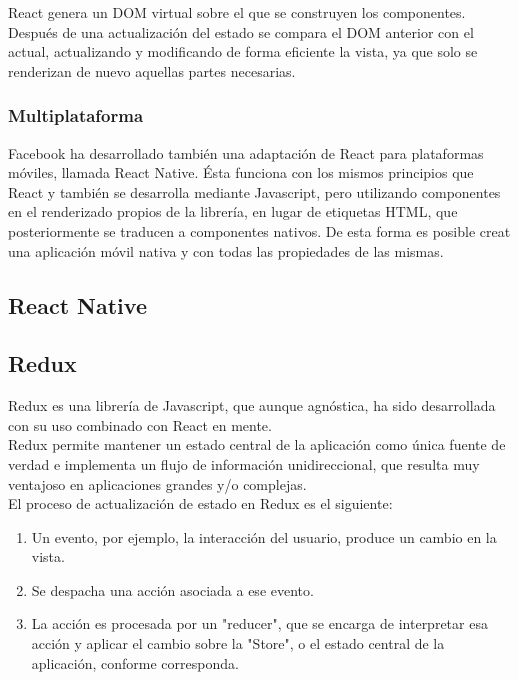 React genera un DOM virtual sobre el que se construyen los componentes. Después de una actualización del estado se compara el DOM anterior con el actual, actualizando y modificando de forma eficiente la vista, ya que solo se renderizan de nuevo aquellas partes necesarias.  \\

\subsubsection {Multiplataforma}

Facebook ha desarrollado también una adaptación de React para plataformas móviles, llamada React Native. Ésta funciona con los mismos principios que React y también se desarrolla mediante Javascript, pero utilizando componentes en el renderizado propios de la librería, en lugar de etiquetas HTML, que posteriormente se traducen a componentes nativos. De esta forma es posible creat una aplicación móvil nativa y con todas las propiedades de las mismas. \\

\subsection {React Native} 

\subsection {Redux}

Redux es una librería de Javascript, que aunque agnóstica, ha sido desarrollada con su uso combinado con React en mente. \\ Redux permite mantener un estado central de la aplicación como única fuente de verdad e implementa un flujo de información unidireccional, que resulta muy ventajoso en aplicaciones grandes y/o complejas. \\

El proceso de actualización de estado en Redux es el siguiente: 

\begin{enumerate}  
	\item  Un evento, por ejemplo, la interacción del usuario, produce un cambio en la vista.
	\item Se despacha una acción asociada a ese evento. 
	\item La acción es procesada por un "reducer", que se encarga de interpretar esa acción y aplicar el cambio sobre la "Store", o el estado central de la aplicación, conforme corresponda.
\end{enumerate}

